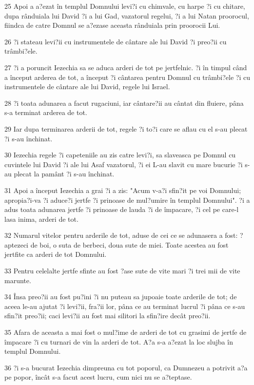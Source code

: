 \par 25 Apoi a a?ezat în templul Domnului levi?i cu chimvale, cu harpe ?i cu chitare, dupa rânduiala lui David ?i a lui Gad, vazatorul regelui, ?i a lui Natan proorocul, fiindca de catre Domnul se a?ezase aceasta rânduiala prin proorocii Lui.
\par 26 ?i stateau levi?ii cu instrumentele de cântare ale lui David ?i preo?ii cu trâmbi?ele.
\par 27 ?i a poruncit Iezechia sa se aduca arderi de tot pe jertfelnic. ?i în timpul când a început arderea de tot, a început ?i cântarea pentru Domnul cu trâmbi?ele ?i cu instrumentele de cântare ale lui David, regele lui Israel.
\par 28 ?i toata adunarea a facut rugaciuni, iar cântare?ii au cântat din fluiere, pâna s-a terminat arderea de tot.
\par 29 Iar dupa terminarea arderii de tot, regele ?i to?i care se aflau cu el s-au plecat ?i s-au închinat.
\par 30 Iezechia regele ?i capeteniile au zis catre levi?i, sa slaveasca pe Domnul cu cuvintele lui David ?i ale lui Asaf vazatorul, ?i ei L-au slavit cu mare bucurie ?i s-au plecat la pamânt ?i s-au închinat.
\par 31 Apoi a început Iezechia a grai ?i a zis: "Acum v-a?i sfin?it pe voi Domnului; apropia?i-va ?i aduce?i jertfe ?i prinoase de mul?umire în templul Domnului". ?i a adus toata adunarea jertfe ?i prinoase de lauda ?i de împacare, ?i cel pe care-l lasa inima, arderi de tot.
\par 32 Numarul vitelor pentru arderile de tot, aduse de cei ce se adunasera a fost: ?aptezeci de boi, o suta de berbeci, doua sute de miei. Toate acestea au fost jertfite ca arderi de tot Domnului.
\par 33 Pentru celelalte jertfe sfinte au fost ?ase sute de vite mari ?i trei mii de vite marunte.
\par 34 Însa preo?ii au fost pu?ini ?i nu puteau sa jupoaie toate arderile de tot; de aceea le-au ajutat ?i levi?ii, fra?ii lor, pâna ce au terminat lucrul ?i pâna ce s-au sfin?it preo?ii; caci levi?ii au fost mai silitori la sfin?ire decât preo?ii.
\par 35 Afara de aceasta a mai fost o mul?ime de arderi de tot cu grasimi de jertfe de împacare ?i cu turnari de vin la arderi de tot. A?a s-a a?ezat la loc slujba în templul Domnului.
\par 36 ?i s-a bucurat Iezechia dimpreuna cu tot poporul, ca Dumnezeu a potrivit a?a pe popor, încât s-a facut acest lucru, cum nici nu se a?teptase.

